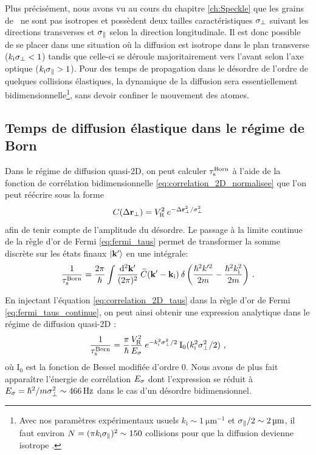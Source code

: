 Plus précisément, nous avons vu au cours du chapitre \ref{ch:Speckle} que les grains de \speckle\ ne sont pas isotropes et possèdent deux tailles caractéristiques $\sigma_{\perp}$ suivant les directions transverses et $\sigma_{\parallel}$ selon la direction longitudinale. Il est donc possible de se placer dans une situation où la diffusion est isotrope dans le plan transverse ($k_{\mathrm{i}}\sigma_{\perp}<1$) tandis que celle-ci se déroule majoritairement vers l'avant selon l'axe optique ($k_{\mathrm{i}}\sigma_{\parallel}>1$). Pour des temps de propagation dans le désordre de l'ordre de quelques collisions élastiques, la dynamique de la diffusion sera essentiellement bidimensionnelle\footnote{Avec nos paramètres expérimentaux usuels $k_{\mathrm{i}}\sim\SI{1}{\micro\metre^{-1}}$ et $\sigma_{\parallel}/2\sim\SI{2}{\micro\metre}$, il faut environ $N=(\pi k_{\mathrm{i}} \sigma_{\parallel})^2 \sim 150$ collisions pour que la diffusion devienne isotrope \citep{denechaud2018vers}.}, sans devoir confiner le mouvement des atomes.


\subsection{Temps de diffusion élastique dans le régime de Born}
\label{sc:taus_born}
Dans le régime de diffusion quasi-2D, on peut calculer $\tau_{\mathrm{s}}^{\mathrm{Born}}$ à l'aide de la fonction de corrélation bidimensionnelle \ref{eq:correlation_2D_normalisee} que l'on peut réécrire sous la forme
\begin{equation}
C(\Delta \mathbf{r}_\perp)=V_{\mathrm{R}}^2 \: e^{-\Delta\mathbf{r}_\perp^2/\sigma_{\perp}^2}
\label{eq:correlation_2D_taus}
\end{equation}
afin de tenir compte de l'amplitude du désordre. Le passage à la limite continue de la règle d'or de Fermi \ref{eq:fermi_taus} permet de transformer la somme discrète sur les états finaux $\left| \mathbf{k}' \right\rangle$ en une intégrale:
\begin{equation}
\frac{1}{\tau_{\mathrm{s}}^{\mathrm{Born}}}=\frac{2\pi}{\hslash} \int{\frac{\mathop{}\mathopen{}\mathrm{d}^2 \mathbf{k}'}{(2\pi)^2} \: \widetilde{C}(\mathbf{k}'-\mathbf{k}_{\mathrm{i}}) \: \delta\left(\frac{\hslash^2 k'^2}{2m}-\frac{\hslash^2k_{\mathrm{i}}^2}{2m}\right)} \text{ .}
\label{eq:fermi_taus_continue}
\end{equation}

En injectant l'équation \ref{eq:correlation_2D_taus} dans la règle d'or de Fermi \ref{eq:fermi_taus_continue}, on peut ainsi obtenir une expression analytique dans le régime de diffusion quasi-2D \citep{shapiro2012cold}:
\begin{equation}
\frac{1}{\tau_{\mathrm{s}}^{\mathrm{Born}} }=\frac{\pi}{\hslash} \frac{V_{\mathrm{R}}^2}{E_{\sigma}} \: e^{- k_{\mathrm{i}}^2 \sigma_{\perp}^2 /2} \: \mathrm{I_0}(k_{\mathrm{i}}^2 \sigma_{\perp}^2 /2) \text{ ,}
\label{eq:taus_born_2D}
\end{equation}
où $\mathrm{I_0}$ est la fonction de Bessel modifiée d'ordre 0. Nous avons de plus fait apparaître l'énergie de corrélation $E_{\sigma}$ dont l'expression se réduit à $E_{\sigma}=\hslash^2/m\sigma_{\perp}^2\sim\SI{466}{\hertz}$ dans le cas d'un désordre bidimensionnel.

